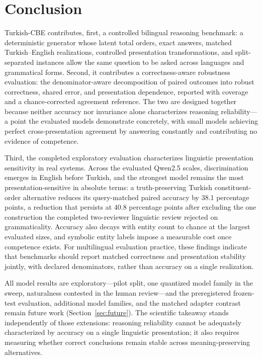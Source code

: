 \section{Conclusion}

Turkish-CBE contributes, first, a controlled bilingual reasoning benchmark: a deterministic generator whose
latent total orders, exact answers, matched Turkish--English realizations, controlled presentation
transformations, and split-separated instances allow the same question to be asked across languages and
grammatical forms. Second, it contributes a correctness-aware robustness evaluation: the denominator-aware
decomposition of paired outcomes into robust correctness, shared error, and presentation dependence,
reported with coverage and a chance-corrected agreement reference. The two are designed together because
neither accuracy nor invariance alone characterizes reasoning reliability---a point the evaluated models
demonstrate concretely, with small models achieving perfect cross-presentation agreement by answering
constantly and contributing no evidence of competence.

Third, the completed exploratory evaluation characterizes linguistic presentation sensitivity in real
systems. Across the evaluated Qwen2.5 scales, discrimination emerges in English before Turkish, and the
strongest model remains the most presentation-sensitive in absolute terms: a truth-preserving Turkish
constituent-order alternative reduces its query-matched paired accuracy by 38.1 percentage points, a
reduction that persists at 40.8 percentage points after excluding the one construction the completed
two-reviewer linguistic review rejected on grammaticality. Accuracy also decays with entity count to chance at the largest evaluated
sizes, and symbolic entity labels impose a measurable cost once competence exists. For multilingual
evaluation practice, these findings indicate that benchmarks should report matched correctness and
presentation stability jointly, with declared denominators, rather than accuracy on a single realization.

All model results are exploratory---pilot split, one quantized model family in the sweep, naturalness
contested in the human review---and the preregistered frozen-test evaluation, additional model families,
and the matched adapter contrast remain future work (Section~\ref{sec:future}). The scientific takeaway
stands independently of those extensions: reasoning reliability cannot be adequately characterized by
accuracy on a single linguistic presentation; it also requires measuring whether correct conclusions remain
stable across meaning-preserving alternatives.
